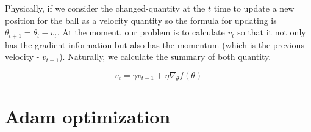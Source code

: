 	Physically, if we consider the changed-quantity at the $t$ time to update a new position for the ball as a velocity quantity so the formula for updating is $ \theta_{t+1} = \theta_t - v_t $. At the moment, our problem is to calculate $v_t$ so that it not only has the gradient information but also has the momentum (which is the previous velocity - $v_{t-1}$). Naturally, we calculate the summary of both quantity.
	
	\[ v_t = \gamma v_{t-1} + \eta\nabla_{\theta}f(\theta)\] 
	
\section{Adam optimization}
	
	
	